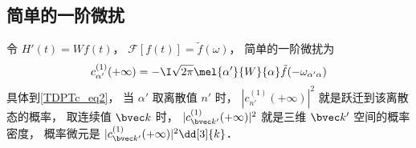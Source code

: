 \subsection{简单的一阶微扰}
令 $H'(t) = W f(t)$， $\mathcal F[f(t)] = \tilde f(\omega)$， 简单的一阶微扰为
\begin{equation}\label{TDPTc_eq1}
c_{\alpha'}^{(1)}(+\infty) = -\I\sqrt{2\pi} \mel{\alpha'}{W}{\alpha} \tilde f(-\omega_{\alpha'\alpha})
\end{equation}
具体到\autoref{TDPTc_eq2}， 当 $\alpha'$ 取离散值 $n'$ 时， $|c_{n'}^{(1)}(+\infty)|^2$ 就是跃迁到该离散态的概率， 取连续值 $\bvec k$ 时， $|c_{\bvec k'}^{(1)}(+\infty)|^2$ 就是三维 $\bvec k'$ 空间的概率密度， 概率微元是 $|c_{\bvec k'}^{(1)}(+\infty)|^2\dd[3]{k}$．

